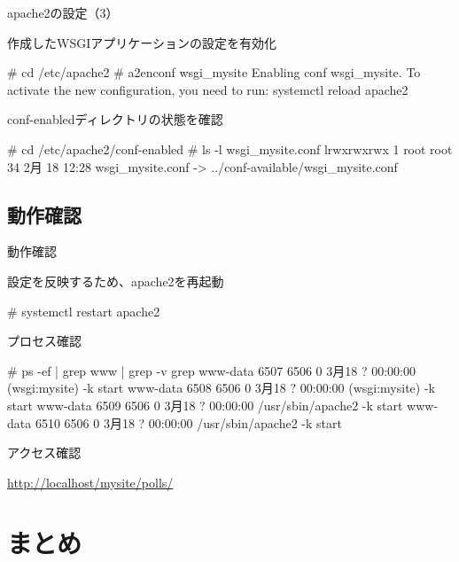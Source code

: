 \begin{frame}[containsverbatim]{apache2の設定（3）}

作成したWSGIアプリケーションの設定を有効化

\begin{commandlinesmall}
# cd /etc/apache2
# a2enconf wsgi_mysite
Enabling conf wsgi_mysite.
To activate the new configuration, you need to run:
systemctl reload apache2  
\end{commandlinesmall}

conf-enabledディレクトリの状態を確認

\begin{commandlinesmall}
# cd /etc/apache2/conf-enabled 
# ls -l wsgi_mysite.conf
lrwxrwxrwx 1 root root 34  2月 18 12:28 wsgi_mysite.conf ->
  ../conf-available/wsgi_mysite.conf
\end{commandlinesmall}

\end{frame}


\subsection{動作確認}

\begin{frame}[containsverbatim]{動作確認}

設定を反映するため、apache2を再起動
  
\begin{commandlinesmall}
# systemctl restart apache2
\end{commandlinesmall}

プロセス確認

\begin{commandlinesmall}
# ps -ef | grep www | grep -v grep
www-data  6507  6506  0  3月18 ?      00:00:00 (wsgi:mysite)     -k start
www-data  6508  6506  0  3月18 ?      00:00:00 (wsgi:mysite)     -k start
www-data  6509  6506  0  3月18 ?      00:00:00 /usr/sbin/apache2 -k start
www-data  6510  6506  0  3月18 ?      00:00:00 /usr/sbin/apache2 -k start  
\end{commandlinesmall}

アクセス確認

\url{http://localhost/mysite/polls/}

\end{frame}

\section{まとめ}

